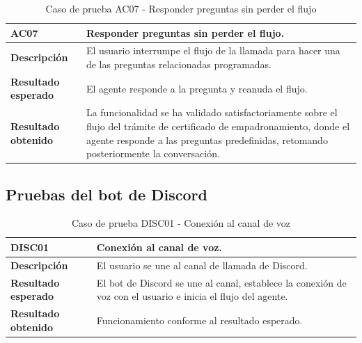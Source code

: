     \begin{table}[H]
        \centering
        \begin{tabular}{|l|p{12cm}|}
        \hline
        \textbf{AC07} & Responder preguntas sin perder el flujo. \\ \hline
        \textbf{Descripción} & El usuario interrumpe el flujo de la llamada para hacer una de las preguntas relacionadas programadas. \\ \hline
        \textbf{Resultado esperado} & El agente responde a la pregunta y reanuda el flujo. \\ \hline
        \textbf{Resultado obtenido} & La funcionalidad se ha validado satisfactoriamente sobre el flujo del trámite de certificado de empadronamiento, donde el agente responde a las preguntas predefinidas, retomando posteriormente la conversación. \\ \hline
        \end{tabular}
        \caption{Caso de prueba AC07 - Responder preguntas sin perder el flujo}
    \end{table}

\subsection{Pruebas del bot de Discord}

    \begin{table}[H]
        \centering
        \begin{tabular}{|l|p{12cm}|}
        \hline
        \textbf{DISC01} & Conexión al canal de voz. \\ \hline
        \textbf{Descripción} & El usuario se une al canal de llamada de Discord. \\ \hline
        \textbf{Resultado esperado} & El bot de Discord se une al canal, establece la conexión de voz con el usuario e inicia el flujo del agente. \\ \hline
        \textbf{Resultado obtenido} & Funcionamiento conforme al resultado esperado. \\ \hline
        \end{tabular}
        \caption{Caso de prueba DISC01 - Conexión al canal de voz}
    \end{table}

